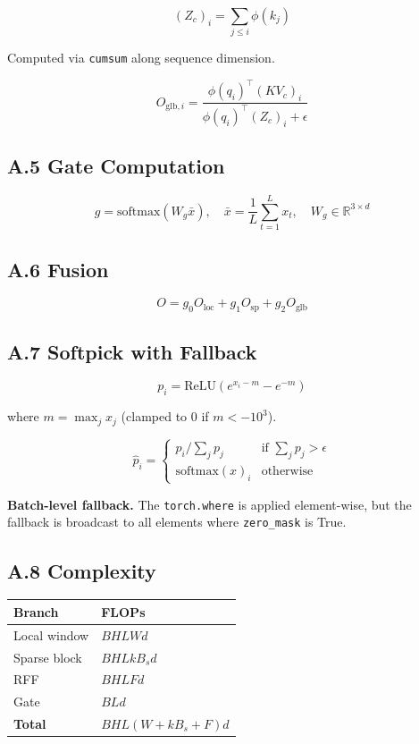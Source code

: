 \[
(Z_c)_i = \sum_{j \leq i} \phi(k_j)
\tag{A.7}
\]

Computed via \texttt{cumsum} along sequence dimension.

\[
O_{\text{glb}, i} = \frac{\phi(q_i)^\top (KV_c)_i}{\phi(q_i)^\top (Z_c)_i + \epsilon}
\tag{A.8}
\]

\subsection{A.5 Gate Computation}

\[
g = \text{softmax}(W_g \bar{x}), \quad
\bar{x} = \frac{1}{L} \sum_{t=1}^{L} x_t, \quad
W_g \in \mathbb{R}^{3 \times d}
\tag{A.9}
\]

\subsection{A.6 Fusion}

\[
O = g_0 O_{\text{loc}} + g_1 O_{\text{sp}} + g_2 O_{\text{glb}}
\tag{A.10}
\]

\subsection{A.7 Softpick with Fallback}

\[
p_i = \text{ReLU}(e^{x_i - m} - e^{-m})
\tag{A.11}
\]

where $m = \max_j x_j$ (clamped to $0$ if $m < -10^3$).

\[
\hat{p}_i = \begin{cases} p_i / \sum_j p_j & \text{if } \sum_j p_j > \epsilon \\ \text{softmax}(x)_i & \text{otherwise} \end{cases}
\tag{A.12}
\]

\textbf{Batch-level fallback.} The \texttt{torch.where} is applied element-wise, but 
the fallback is broadcast to all elements where \texttt{zero\_mask} is True.

\subsection{A.8 Complexity}

\begin{table}[H]
\centering
\small
\begin{tabular}{ll}
\toprule
\textbf{Branch} & \textbf{FLOPs} \\
\midrule
Local window & $B H L W d$ \\
Sparse block & $B H L k B_s d$ \\
RFF & $B H L F d$ \\
Gate & $B L d$ \\
\textbf{Total} & $B H L (W + k B_s + F) d$ \\
\bottomrule
\end{tabular}
\end{table}

